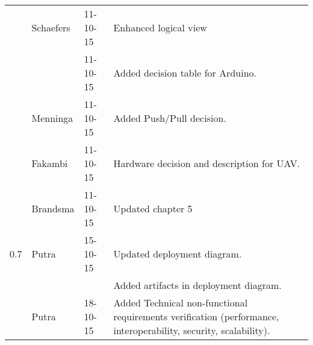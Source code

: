 \begin{longtable}{L{} L{} L{} L{}}
	                 & Schaefers             & 11-10-15      & Enhanced logical view                                                                                                                                                                                                      \\
	                 &                       & 11-10-15      & Added decision table for Arduino.                                                                                                                                                                                          \\
	                 & Menninga              & 11-10-15      & Added Push/Pull decision.                                                                                                                                                                                                  \\
	                 & Fakambi               & 11-10-15      & Hardware decision and description for UAV.                                                                                                                                                                                 \\
	                 & Brandsma              & 11-10-15      & Updated chapter 5                                                                                                                                                                                                          \\
	\midrule
			
	0.7              & Putra                 & 15-10-15      & Updated deployment diagram. \\
	                 &                       &               & Added artifacts in deployment diagram. \\
                     & Putra                 & 18-10-15      & Added Technical non-functional requirements verification (performance, interoperability, security, scalability). \\
	\bottomrule
\end{longtable}